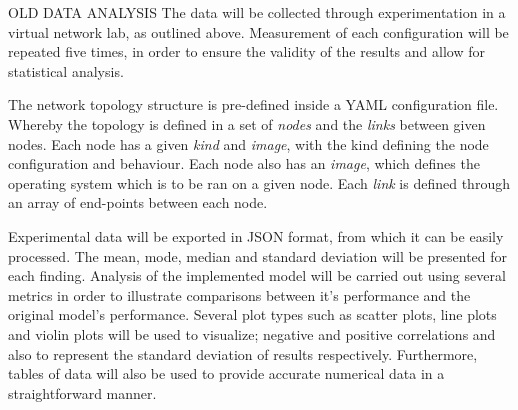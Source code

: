 OLD DATA ANALYSIS
The data will be collected through experimentation in a virtual network lab, as outlined above. Measurement of each configuration will be repeated five times, in order to ensure the validity of the results and allow for statistical analysis. 

The network topology structure is pre-defined inside a YAML configuration file. Whereby the topology is defined in a set of \textit{nodes} and the \textit{links} between given nodes. Each node has a given \textit{kind} and \textit{image}, with the kind defining the node configuration and behaviour. Each node also has an \textit{image}, which defines the operating system which is to be ran on a given node. Each \textit{link} is defined through an array of end-points between each node. 

Experimental data will be exported in JSON format, from which it can be easily processed. The mean, mode, median and standard deviation will be presented for each finding. Analysis of the implemented model will be carried out using several metrics in order to illustrate comparisons between it's performance and the original model's performance. Several plot types such as scatter plots, line plots and violin plots will be used to visualize; negative and positive correlations and also to represent the standard deviation of results respectively. Furthermore, tables of data will also be used to provide accurate numerical data in a straightforward manner.